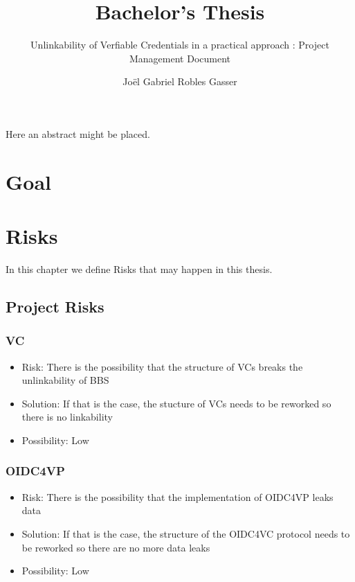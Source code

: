 \documentclass[
	a4paper               %
	,BCOR=0mm            %
	,bibliography=totoc   %
	,listof=totoc         %
	,monolingual
	,twoside=false
]{bfhthesis}              %
\begin{document}
\frontmatter

\title{Bachelor's Thesis}
\subtitle{Unlinkability of Verfiable Credentials in a practical approach
: Project Management Document}
\author{Joël Gabriel Robles Gasser}

\maketitle

Here an abstract might be placed.


\tableofcontents

\mainmatter

\chapter{Goal}

\chapter{Risks}
In this chapter we define Risks that may happen in this thesis.

\section{Project Risks}

\subsection{VC}
\begin{itemize}
	\item Risk: There is the possibility that the structure of VCs breaks the unlinkability of BBS
	\item Solution: If that is the case, the stucture of VCs needs to be reworked so there is no linkability
	\item Possibility: Low
\end{itemize}

\subsection{OIDC4VP}
\begin{itemize}
	\item Risk: There is the possibility that the implementation of OIDC4VP leaks data
	\item Solution: If that is the case, the structure of the OIDC4VC protocol needs to be reworked so there are no more data leaks
	\item Possibility: Low
\end{itemize}
\end{document}
